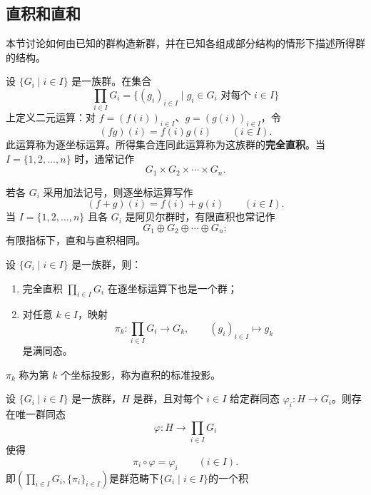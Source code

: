 \subsection{直积和直和}

\begin{purplenote}
本节讨论如何由已知的群构造新群，并在已知各组成部分结构的情形下描述所得群的结构。
\end{purplenote}

\begin{definition}[直积与完全直积]\label{def:external-direct-product}
设 $\{G_i\mid i\in I\}$ 是一族群。在集合
\[
  \prod_{i\in I}G_i
  =\{(g_i)_{i\in I}\mid g_i\in G_i\text{ 对每个 }i\in I\}
\]
上定义二元运算：对 $f=(f(i))_{i\in I}$、$g=(g(i))_{i\in I}$，令
\[
  (fg)(i)=f(i)g(i)\qquad(i\in I).
\]
此运算称为逐坐标运算。所得集合连同此运算称为这族群的\textbf{完全直积}。当 $I=\{1,2,\ldots,n\}$ 时，通常记作
\[
  G_1\times G_2\times\cdots\times G_n.
\]
\end{definition}

\begin{purplenote}
若各 $G_i$ 采用加法记号，则逐坐标运算写作
\[
  (f+g)(i)=f(i)+g(i)\qquad(i\in I).
\]
当 $I=\{1,2,\ldots,n\}$ 且各 $G_i$ 是阿贝尔群时，有限直积也常记作
\[
  G_1\oplus G_2\oplus\cdots\oplus G_n;
\]
有限指标下，直和与直积相同。
\end{purplenote}

\begin{theorem}\label{thm:direct-product-group}
设 $\{G_i\mid i\in I\}$ 是一族群，则：
\begin{enumerate}[label=(\arabic*)]
  \item 完全直积 $\prod_{i\in I}G_i$ 在逐坐标运算下也是一个群；
  \item 对任意 $k\in I$，映射
  \[
    \pi_k:\prod_{i\in I}G_i\longrightarrow G_k,
    \qquad (g_i)_{i\in I}\longmapsto g_k
  \]
  是满同态。
\end{enumerate}
\end{theorem}

\begin{purplenote}
$\pi_k$ 称为第 $k$ 个坐标投影，称为直积的标准投影。
\end{purplenote}

\begin{theorem}\label{thm:direct-product-universal-property}
设 $\{G_i\mid i\in I\}$ 是一族群，$H$ 是群，且对每个 $i\in I$ 给定群同态 $\varphi_i:H\to G_i$。则存在唯一群同态
\[
  \varphi:H\longrightarrow\prod_{i\in I}G_i
\]
使得
\[
  \pi_i\circ\varphi=\varphi_i\qquad(i\in I).
\]
即$(\prod_{i\in I}G_i, \{\pi_i\}_{i\in I})$是群范畴下$\{G_i\mid i\in I\}$的一个积
\end{theorem}

